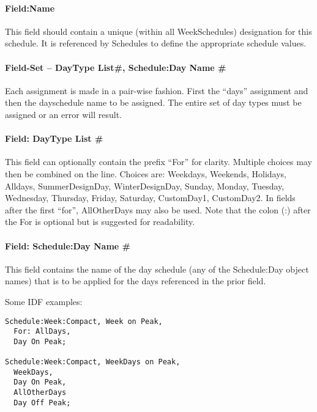 \paragraph{Field:Name}\label{fieldname}

This field should contain a unique (within all WeekSchedules) designation for this schedule. It is referenced by Schedules to define the appropriate schedule values.

\paragraph{Field-Set -- DayType List\#, Schedule:Day Name \#}\label{field-set-daytype-list-scheduleday-name}

Each assignment is made in a pair-wise fashion. First the ``days'' assignment and then the dayschedule name to be assigned. The entire set of day types must be assigned or an error will result.

\paragraph{Field: DayType List \#}\label{field-daytype-list}

This field can optionally contain the prefix ``For'' for clarity. Multiple choices may then be combined on the line. Choices are: Weekdays, Weekends, Holidays, Alldays, SummerDesignDay, WinterDesignDay, Sunday, Monday, Tuesday, Wednesday, Thursday, Friday, Saturday, CustomDay1, CustomDay2. In fields after the first ``for'', AllOtherDays may also be used. Note that the colon (:) after the For is optional but is suggested for readability.

\paragraph{Field: Schedule:Day Name \#}\label{field-scheduleday-name}

This field contains the name of the day schedule (any of the Schedule:Day object names) that is to be applied for the days referenced in the prior field.

Some IDF examples:

\begin{lstlisting}
Schedule:Week:Compact, Week on Peak,
  For: AllDays,
  Day On Peak;

Schedule:Week:Compact, WeekDays on Peak,
  WeekDays,
  Day On Peak,
  AllOtherDays
  Day Off Peak;
\end{lstlisting}

